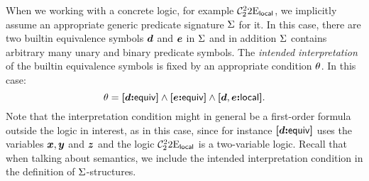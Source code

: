 When we working with a concrete logic, for example
$\mathcal{C}^{2}_{2}{2}\mathrm{E}_{\mathsf{local}}$,
we implicitly assume an appropriate generic predicate signature $\mathrm{\Sigma}$ for it.
In this case, there are two builtin equivalence symbols $\bm{d}$ and $\bm{e}$ in
$\mathrm{\Sigma}$ and in addition $\mathrm{\Sigma}$ contains arbitrary many unary
and binary predicate symbols.
The \emph{intended interpretation} of the builtin equivalence symbols is fixed
by an appropriate condition $\theta$.
In this case:
\[
  \theta = {\bm{[}\bm{d}\mathord{\bm{:}}\mathsf{equiv}\bm{]}} \land {\bm{[}\bm{e}\mathord{\bm{:}}\mathsf{equiv}\bm{]}} \land {\bm{[}\bm{d},\bm{e}\mathord{\bm{:}}\mathsf{local}\bm{]}}.
\] 
Note that the interpretation condition might in general be a first-order formula
outside the logic in interest, as in this case, since for instance ${\bm{[}\bm{d}\mathord{\bm{:}}\mathsf{equiv}\bm{]}}$
uses the variables $\bm{x},\bm{y}$ and $\bm{z}$ and the logic $\mathcal{C}^{2}_{2}{2}\mathrm{E}_{\mathsf{local}}$
is a two-variable logic.
Recall that when talking about semantics, we include the intended interpretation
condition in the definition of $\mathrm{\Sigma}$-structures.